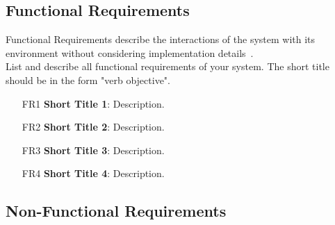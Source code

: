 \documentclass[
	pdftex,
	letterpaper,
	titlepage,
	final,
	oneside,
	11pt,
	DIV=calc,
]{scrbook}
\begin{document}
\subsection*{Functional Requirements}

\begin{tcolorbox}[breakable]
	Functional Requirements describe the interactions of the system with its environment without considering implementation details~\cite{bruegge2013object}.
	\\
	List and describe all functional requirements of your system.
	The short title should be in the form "verb objective". 
\end{tcolorbox}

\begin{itemize}[itemindent=-4pt, leftmargin=34pt, align=left]
    \item[FR1] \textbf{Short Title 1}: Description.
    \item[FR2] \textbf{Short Title 2}: Description.
    \item[FR3] \textbf{Short Title 3}: Description.
    \item[FR4] \textbf{Short Title 4}: Description.
\end{itemize}


\subsection*{Non-Functional Requirements}
\end{document}
